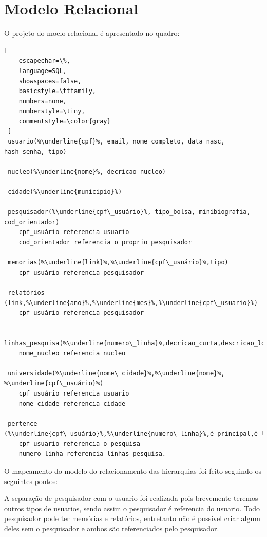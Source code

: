 \documentclass[11pt]{../../classes/ifscarticle}
\begin{document}
\section{Modelo Relacional}
O projeto do moelo relacional é apresentado no quadro:
\begin{lstlisting}[
    escapechar=\%,
    language=SQL,
    showspaces=false,
    basicstyle=\ttfamily,
    numbers=none,
    numberstyle=\tiny,
    commentstyle=\color{gray}
 ]
 usuario(%\underline{cpf}%, email, nome_completo, data_nasc, hash_senha, tipo)

 nucleo(%\underline{nome}%, decricao_nucleo)
 
 cidade(%\underline{municipio}%)

 pesquisador(%\underline{cpf\_usuário}%, tipo_bolsa, minibiografia, cod_orientador)
    cpf_usuário referencia usuario
    cod_orientador referencia o proprio pesquisador

 memorias(%\underline{link}%,%\underline{cpf\_usuário}%,tipo)
    cpf_usuário referencia pesquisador

 relatórios (link,%\underline{ano}%,%\underline{mes}%,%\underline{cpf\_usuario}%)
    cpf_usuário referencia pesquisador

 linhas_pesquisa(%\underline{numero\_linha}%,decricao_curta,descricao_longa,nome_nucleo)
    nome_nucleo referencia nucleo

 universidade(%\underline{nome\_cidade}%,%\underline{nome}%, %\underline{cpf\_usuário}%)
    cpf_usuário referencia usuario
    nome_cidade referencia cidade

 pertence (%\underline{cpf\_usuário}%,%\underline{numero\_linha}%,é_principal,é_lider_pesquisa)
    cpf_usuario referencia o pesquisa
    numero_linha referencia linhas_pesquisa.
\end{lstlisting}

O mapeamento do modelo do relacionamento das hierarquias
foi feito seguindo os seguintes pontos:

A separação de pesquisador com o usuario foi realizada 
pois brevemente teremos outros tipos de usuarios, 
sendo assim 
o pesquisador é referencia do usuario. 
Todo pesquisador pode ter memórias
e relatórios, entretanto não é possivel criar algum deles sem 
o pesquisador e ambos são referenciados pelo pesquisador.
\end{document}
